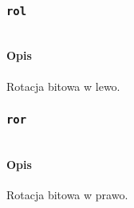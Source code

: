 \subsubsection{\texttt{rol}}

\begin{lstlisting}
\end{lstlisting}

\paragraph*{Opis} Rotacja bitowa w lewo.

\subsubsection{\texttt{ror}}

\begin{lstlisting}
\end{lstlisting}

\paragraph*{Opis} Rotacja bitowa w prawo.
